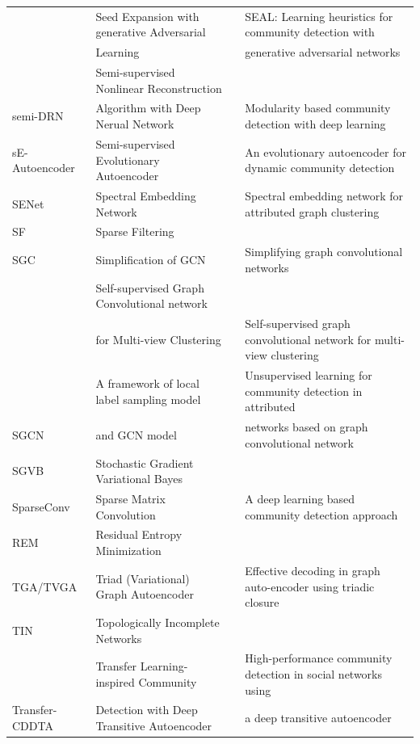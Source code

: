 \begin{table}[!t]
\begin{tabular}{llll}
\rowcolor{gray!30}
& Seed Expansion with generative Adversarial &  & SEAL: Learning heuristics for community detection with \\
\rowcolor{gray!30}
\multirow{-2}{*}{SEAL} & Learning & \multirow{-2}{*}{} & generative adversarial networks \\
& Semi-supervised Nonlinear Reconstruction &  &  \\ 
\multirow{-2}{*}{semi-DRN} & Algorithm with Deep Nerual Network & \multirow{-2}{*}{} & \multirow{-2}{*}{Modularity based community detection with deep learning} \\ 
\rowcolor{gray!30}
sE-Autoencoder & Semi-supervised Evolutionary Autoencoder &  & An evolutionary autoencoder for dynamic community detection \\
SENet & Spectral Embedding Network &  & Spectral embedding network for attributed graph clustering \\
\rowcolor{gray!30}
SF & Sparse Filtering &  &  \\
SGC &  Simplification of GCN &  & Simplifying graph convolutional networks \\
\rowcolor{gray!30}
& Self-supervised Graph Convolutional network &  &  \\ 
\rowcolor{gray!30}
\multirow{-2}{*}{SGCMC} & for Multi-view Clustering & \multirow{-2}{*}{} & \multirow{-2}{*}{Self-supervised graph convolutional network for multi-view clustering} \\ 
& A framework of local label sampling model & & Unsupervised learning for community detection in attributed \\ 
\multirow{-2}{*}{SGCN} & and GCN model & \multirow{-2}{*}{} & networks based on graph convolutional network \\
\rowcolor{gray!30}
SGVB & Stochastic Gradient Variational Bayes & & \\
SparseConv & Sparse Matrix Convolution &  & A deep learning based community detection approach \\ \midrule
\rowcolor{gray!30}
REM & Residual Entropy Minimization & & \\ \midrule
TGA/TVGA & Triad (Variational) Graph Autoencoder &  & Effective decoding in graph auto-encoder using triadic closure \\
\rowcolor{gray!30}
TIN & Topologically Incomplete Networks&  &  \\
& Transfer Learning-inspired Community & & High-performance community detection in social networks using \\
\multirow{-2}{*}{Transfer-CDDTA} & Detection with Deep Transitive Autoencoder & \multirow{-2}{*}{} &  a deep transitive autoencoder \\

\end{tabular}
\end{table}
